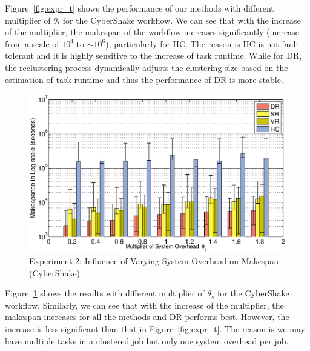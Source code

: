 \documentclass{IOS-Book-Article}
\begin{document}
Figure~\ref{fig:expr_t} shows the performance of our methods with different multiplier of $\theta_{t}$ for the CyberShake workflow. We can see that with the increase of the multiplier, the makespan of the workflow increases significantly (increase from a scale of $10^4$ to $\sim 10^6$), particularly for HC. The reason is HC is not fault tolerant and it is highly sensitive to the increase of task runtime. While for DR, the reclustering process dynamically adjusts the clustering size based on the estimation of task runtime and thus the performance of DR is more stable. 

\begin{figure}[!htb]
\centering
  \includegraphics[width=1\linewidth]{d.eps}
  \caption{Experiment 2: Influence of Varying System Overhead on Makespan (CyberShake)}
  \label{fig:expr_d}
\end{figure}

Figure~\ref{fig:expr_d} shows the results with different multiplier of $\theta_{s}$ for the CyberShake workflow. Similarly, we can see that with the increase of the multiplier, the makespan increases for all the methods and DR performs best. However, the increase is less significant than that in Figure~\ref{fig:expr_t}. The reason is we may have multiple tasks in a clustered job but only one system overhead per job.
\end{document}
